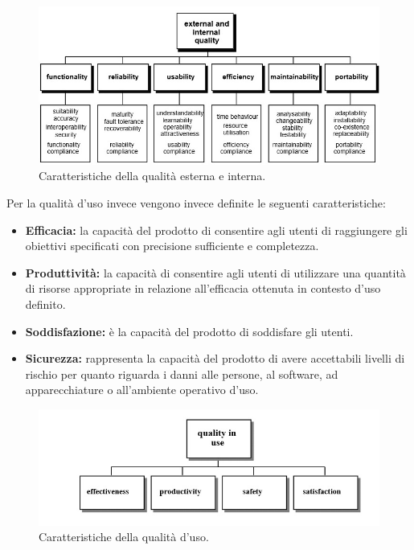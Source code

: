 \documentclass[a4paper]{article}
\begin{document}
				\begin{figure}[H]
				\centering
					\includegraphics[scale=0.65]{metrichediqualita.jpg}
					\caption{Caratteristiche della qualità esterna e interna.}
				\end{figure}
				Per la qualità d'uso invece vengono invece definite le seguenti caratteristiche:
				\begin{itemize}
					\item \textbf{Efficacia:} la capacità del prodotto di consentire agli utenti di raggiungere gli obiettivi
					specificati con precisione sufficiente e completezza. 
					\item \textbf{Produttività:} la capacità di consentire agli utenti di utilizzare una quantità di risorse
					appropriate in relazione all'efficacia ottenuta in contesto d'uso definito. 
					\item \textbf{Soddisfazione:} è la capacità del prodotto di soddisfare gli utenti. 
					\item \textbf{Sicurezza:} rappresenta la capacità del prodotto di avere accettabili livelli di rischio per
					quanto riguarda i danni alle persone, al software, ad apparecchiature o all'ambiente operativo d'uso. 
				\end{itemize}
				
				\begin{figure}[H]
					\centering
					\includegraphics[scale=0.65]{qualitainuso.jpg}
					\caption{Caratteristiche della qualità d'uso.}
				\end{figure}
\end{document}
